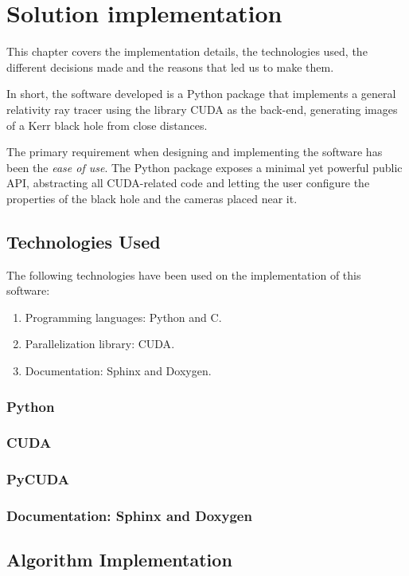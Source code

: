 \chapter{Solution implementation}
\label{chapter:implementation}

This chapter covers the implementation details, the technologies used, the different decisions made and the reasons that led us to make them.

In short, the software developed is a Python package that implements a general relativity ray tracer using the library \ac{CUDA} as the back-end, generating images of a Kerr black hole from close distances.

The primary requirement when designing and implementing the software has been the \emph{ease of use}. The Python package exposes a minimal yet powerful public \ac{API}, abstracting all \ac{CUDA}-related code and letting the user configure the properties of the black hole and the cameras placed near it.

\section{Technologies Used}

The following technologies have been used on the implementation of this software:
\begin{enumerate}
	\item Programming languages: Python and C.
	\item Parallelization library: \ac{CUDA}.
	\item Documentation: Sphinx and Doxygen.
\end{enumerate}

\subsection{Python}
\subsection{CUDA}
\subsection{PyCUDA}
\subsection{Documentation: Sphinx and Doxygen}

\section{Algorithm Implementation}
